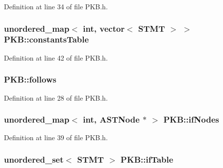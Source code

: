 Definition at line 34 of file P\-K\-B.\-h.

\hypertarget{class_p_k_b_a3354b7bf1c997e868b9273e5d19d673e}{
\subsubsection[{constants\-Table}]{\setlength{\rightskip}{0pt plus 5cm}unordered\-\_\-map$<$ int, vector$<$ {\bf S\-T\-M\-T} $>$ $>$ P\-K\-B\-::constants\-Table\hspace{0.3cm}{\ttfamily [static]}}}\label{class_p_k_b_a3354b7bf1c997e868b9273e5d19d673e}


Definition at line 42 of file P\-K\-B.\-h.

\hypertarget{class_p_k_b_a93dcc37be7f8e851ff4317925c07a9f5}{
\subsubsection[{follows}]{ P\-K\-B\-::follows\hspace{0.3cm}{\ttfamily [static]}}}\label{class_p_k_b_a93dcc37be7f8e851ff4317925c07a9f5}


Definition at line 28 of file P\-K\-B.\-h.

\hypertarget{class_p_k_b_abc04a09157ed8733ea6ce207af0a837d}{
\subsubsection[{if\-Nodes}]{\setlength{\rightskip}{0pt plus 5cm}unordered\-\_\-map$<$ int, {\bf A\-S\-T\-Node} $\ast$ $>$ P\-K\-B\-::if\-Nodes\hspace{0.3cm}{\ttfamily [static]}}}\label{class_p_k_b_abc04a09157ed8733ea6ce207af0a837d}


Definition at line 39 of file P\-K\-B.\-h.

\hypertarget{class_p_k_b_a151454c4bd06a6a0df1905cb21634f13}{
\subsubsection[{if\-Table}]{\setlength{\rightskip}{0pt plus 5cm}unordered\-\_\-set$<$ {\bf S\-T\-M\-T} $>$ P\-K\-B\-::if\-Table\hspace{0.3cm}{\ttfamily [static]}}}\label{class_p_k_b_a151454c4bd06a6a0df1905cb21634f13}


